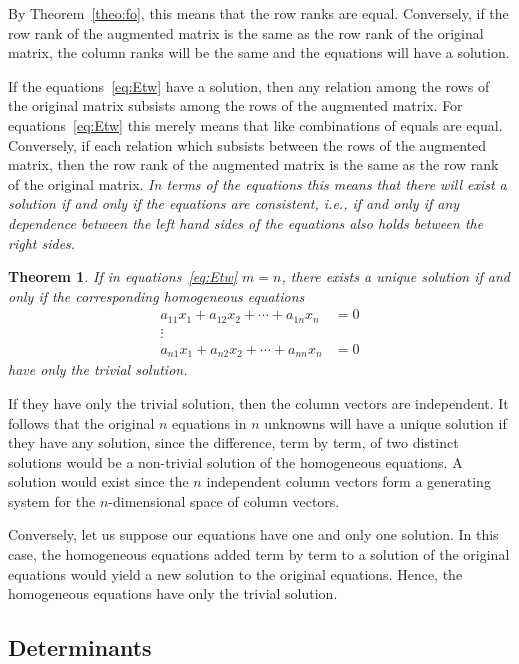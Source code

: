 \documentclass[11pt]{article}
\newtheorem{theo}{Theorem}
\theoremstyle{definition}
\begin{document}
By Theorem~\ref{theo:fo}, this means that the row ranks are equal.
Conversely, if the row rank of the augmented matrix is the same as the row rank of the original matrix, the column ranks will be the same and the equations will have a solution.

If the equations~\eqref{eq:Etw} have a solution, then any relation among the rows of the original matrix subsists among the rows of the augmented matrix.
For equations~\eqref{eq:Etw} this merely means that like combinations of equals are equal.
Conversely, if each relation which subsists between the rows of the augmented matrix, then the row rank of the augmented matrix is the same as the row rank of the original matrix.
\emph{In terms of the equations this means that there will exist a solution if and only if the equations are consistent, i.e., if and only if any dependence between the left hand sides of the equations also holds between the right sides.}


\begin{theo}
\label{theo:fi}
If in equations~\eqref{eq:Etw} $m = n$, there exists a unique solution if and only if the corresponding homogeneous equations
\begin{align*}
a_{11}x_1 + a_{12}x_2 + \cdots + a_{1n}x_n &= 0
\\
\vdots &
\\
a_{n1}x_1 + a_{n2}x_2 + \cdots + a_{nn}x_n &= 0
\end{align*}
have only the trivial solution.
\end{theo}


If they have only the trivial solution, then the column vectors are independent.
It follows that the original $n$ equations in $n$ unknowns will have a unique solution if they have any solution, since the difference, term by term, of two distinct solutions would be a non-trivial solution of the homogeneous equations.
A solution would exist since the $n$ independent column vectors form a generating system for the $n$-dimensional space of column vectors.

Conversely, let us suppose our equations have one and only one solution.
In this case, the homogeneous equations added term by term to a solution of the original equations would yield a new solution to the original equations.
Hence, the homogeneous equations have only the trivial solution.


\subsection{Determinants}
\end{document}
